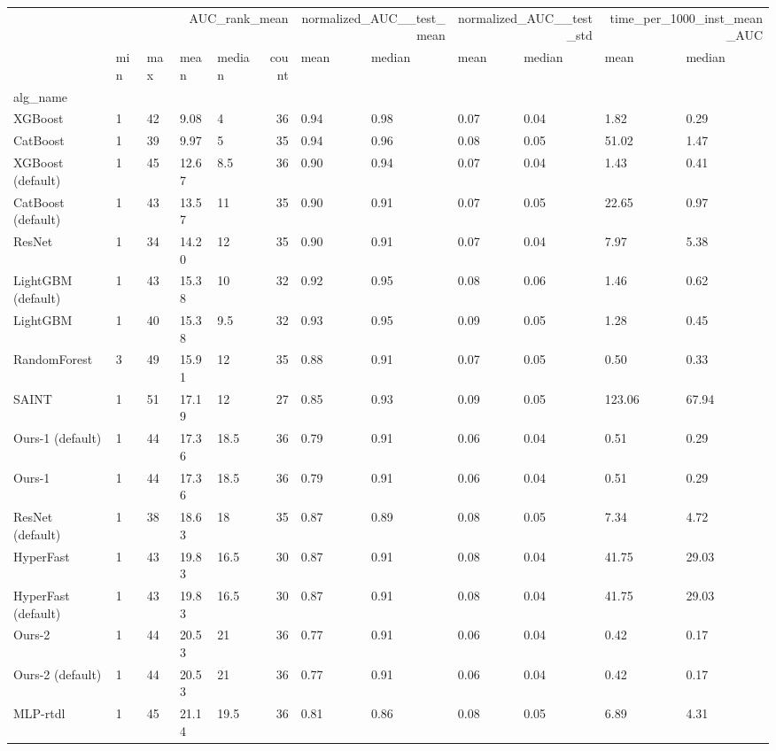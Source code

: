 \begin{tabular}{lllllrllllll}
\toprule
 & \multicolumn{5}{r}{AUC_rank_mean} & \multicolumn{2}{r}{normalized_AUC__test_mean} & \multicolumn{2}{r}{normalized_AUC__test_std} & \multicolumn{2}{r}{time_per_1000_inst_mean_AUC} \\
 & min & max & mean & median & count & mean & median & mean & median & mean & median \\
alg_name &  &  &  &  &  &  &  &  &  &  &  \\
\midrule
XGBoost & 1 & 42 & 9.08 & 4 & 36 & 0.94 & 0.98 & 0.07 & 0.04 & 1.82 & 0.29 \\
CatBoost & 1 & 39 & 9.97 & 5 & 35 & 0.94 & 0.96 & 0.08 & 0.05 & 51.02 & 1.47 \\
XGBoost (default) & 1 & 45 & 12.67 & 8.5 & 36 & 0.90 & 0.94 & 0.07 & 0.04 & 1.43 & 0.41 \\
CatBoost (default) & 1 & 43 & 13.57 & 11 & 35 & 0.90 & 0.91 & 0.07 & 0.05 & 22.65 & 0.97 \\
ResNet & 1 & 34 & 14.20 & 12 & 35 & 0.90 & 0.91 & 0.07 & 0.04 & 7.97 & 5.38 \\
LightGBM (default) & 1 & 43 & 15.38 & 10 & 32 & 0.92 & 0.95 & 0.08 & 0.06 & 1.46 & 0.62 \\
LightGBM & 1 & 40 & 15.38 & 9.5 & 32 & 0.93 & 0.95 & 0.09 & 0.05 & 1.28 & 0.45 \\
RandomForest & 3 & 49 & 15.91 & 12 & 35 & 0.88 & 0.91 & 0.07 & 0.05 & 0.50 & 0.33 \\
SAINT & 1 & 51 & 17.19 & 12 & 27 & 0.85 & 0.93 & 0.09 & 0.05 & 123.06 & 67.94 \\
Ours-1 (default) & 1 & 44 & 17.36 & 18.5 & 36 & 0.79 & 0.91 & 0.06 & 0.04 & 0.51 & 0.29 \\
Ours-1 & 1 & 44 & 17.36 & 18.5 & 36 & 0.79 & 0.91 & 0.06 & 0.04 & 0.51 & 0.29 \\
ResNet (default) & 1 & 38 & 18.63 & 18 & 35 & 0.87 & 0.89 & 0.08 & 0.05 & 7.34 & 4.72 \\
HyperFast & 1 & 43 & 19.83 & 16.5 & 30 & 0.87 & 0.91 & 0.08 & 0.04 & 41.75 & 29.03 \\
HyperFast (default) & 1 & 43 & 19.83 & 16.5 & 30 & 0.87 & 0.91 & 0.08 & 0.04 & 41.75 & 29.03 \\
Ours-2 & 1 & 44 & 20.53 & 21 & 36 & 0.77 & 0.91 & 0.06 & 0.04 & 0.42 & 0.17 \\
Ours-2 (default) & 1 & 44 & 20.53 & 21 & 36 & 0.77 & 0.91 & 0.06 & 0.04 & 0.42 & 0.17 \\
MLP-rtdl & 1 & 45 & 21.14 & 19.5 & 36 & 0.81 & 0.86 & 0.08 & 0.05 & 6.89 & 4.31 \\

\end{tabular}
